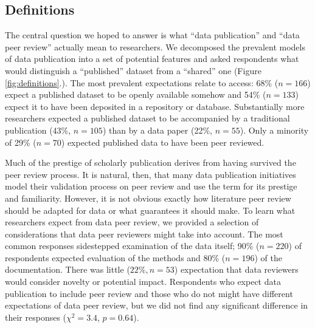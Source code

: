 \documentclass[10pt]{article}
\begin{document}
\subsection*{Definitions}

The central question we hoped to answer is what ``data publication'' and ``data peer review'' actually mean to researchers.
We decomposed the prevalent models of data publication into a set of potential features and asked respondents what would distinguish a ``published'' dataset from a ``shared'' one (Figure \ref{fig:definitions}.).
The most prevalent expectations relate to access: 68\% ($n=166$) expect a published dataset to be openly available somehow and 54\% ($n=133$) expect it to have been deposited in a repository or database.
Substantially more researchers expected a published dataset to be accompanied by a traditional publication (43\%, $n=105$) than by a data paper (22\%, $n=55$).
Only a minority of 29\% ($n=70$) expected published data to have been peer reviewed.

Much of the prestige of scholarly publication derives from having survived the peer review process.
It is natural, then, that many data publication initiatives model their validation process on peer review and use the term for its prestige and familiarity.
However, it is not obvious exactly how literature peer review should be adapted for data or what guarantees it should make.
To learn what researchers expect from data peer review, we provided a selection of considerations that data peer reviewers might take into account.
The most common responses sidestepped examination of the data itself; 90\% ($n=220$) of respondents expected evaluation of the methods and 80\% ($n=196$) of the documentation.
There was little ($22\%, n=53$) expectation that data reviewers would consider novelty or potential impact.
Respondents who expect data publication to include peer review and those who do not might have different expectations of data peer review, but we did not find any significant difference in their responses ($\chi^{2}=3.4$, $p=0.64$).  
\end{document}
